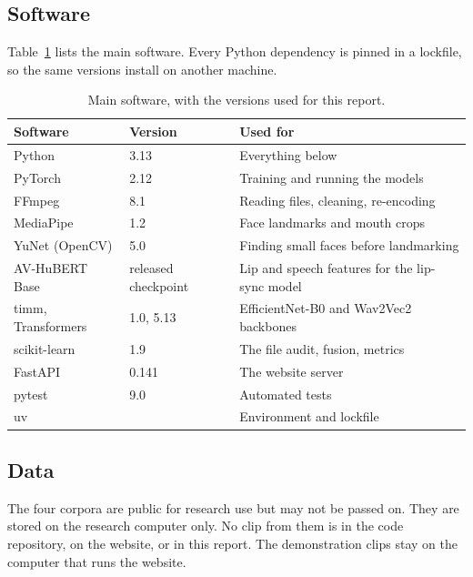 \subsection{Software}

Table~\ref{tab:software} lists the main software. Every Python dependency is
pinned in a lockfile, so the same versions install on another machine.

\begin{table}[ht]
    \centering
    \small
    \caption{Main software, with the versions used for this report.}
    \label{tab:software}
    \begin{tabularx}{\textwidth}{@{}l l >{\raggedright\arraybackslash}X@{}}
        \toprule
        \textbf{Software} & \textbf{Version} & \textbf{Used for} \\
        \midrule
        Python & 3.13 & Everything below \\
        PyTorch & 2.12 & Training and running the models \\
        FFmpeg & 8.1 & Reading files, cleaning, re-encoding \\
        MediaPipe & 1.2 & Face landmarks and mouth crops \\
        YuNet (OpenCV) & 5.0 & Finding small faces before landmarking \\
        AV-HuBERT Base & released checkpoint & Lip and speech features for the lip-sync model \\
        timm, Transformers & 1.0, 5.13 & EfficientNet-B0 and Wav2Vec2 backbones \\
        scikit-learn & 1.9 & The file audit, fusion, metrics \\
        FastAPI & 0.141 & The website server \\
        pytest & 9.0 & Automated tests \\
        uv & & Environment and lockfile \\
        \bottomrule
    \end{tabularx}
\end{table}

\subsection{Data}

The four corpora are public for research use but may not be passed on. They
are stored on the research computer only. No clip from them is in the code
repository, on the website, or in this report. The demonstration clips stay on
the computer that runs the website.

